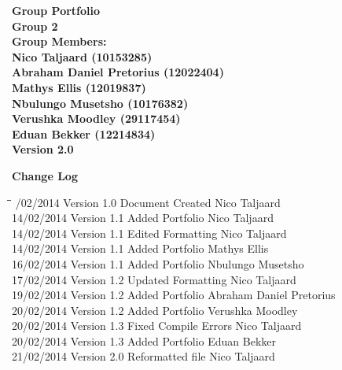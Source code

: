 \documentclass[12pt]{article}
\newcommand{\Title}{Group Portfolio} %
\begin{document}
	\begin{center}%
	
	  \LARGE \bf \Title \\[4em]
	  \LARGE {\bf Group 2}\\[1em]
	  \LARGE {\bf Group Members:}\\[2em]
	  \large
	      Nico Taljaard					(10153285) \\[1em]
	      Abraham Daniel Pretorius		(12022404) \\[1em]
	      Mathys Ellis					(12019837) \\[1em]
	      Nbulungo Musetsho				(10176382) \\[1em]
	      Verushka Moodley				(29117454) \\[1em]
	      Eduan Bekker					(12214834) \\[8em]
	      {\bf Version 2.0}	    
	\end{center}%
	
	\newpage
	{\LARGE \bf Change Log}\\[2em]	
		\begin{tabbing}
			\hspace*{3cm}\=\hspace*{3cm}\=\hspace*{8cm}\=\hspace*{3cm} /02/2014 \> Version 1.0 \> Document Created \> Nico Taljaard\\
			14/02/2014 \> Version 1.1 \> Added Portfolio \> Nico Taljaard\\
			14/02/2014 \> Version 1.1 \> Edited Formatting \> Nico Taljaard\\
			14/02/2014 \> Version 1.1 \> Added Portfolio \> Mathys Ellis\\
			16/02/2014 \> Version 1.1 \> Added Portfolio \> Nbulungo Musetsho\\
			17/02/2014 \> Version 1.2 \> Updated Formatting \> Nico Taljaard\\
			19/02/2014 \> Version 1.2 \> Added Portfolio \> Abraham Daniel Pretorius\\
			20/02/2014 \> Version 1.2 \> Added Portfolio \> Verushka Moodley\\
			20/02/2014 \> Version 1.3 \> Fixed Compile Errors \> Nico Taljaard\\
			20/02/2014 \> Version 1.3 \> Added Portfolio \> Eduan Bekker\\
			21/02/2014 \> Version 2.0 \> Reformatted file \> Nico Taljaard\\
		\end{tabbing}
\end{document}
